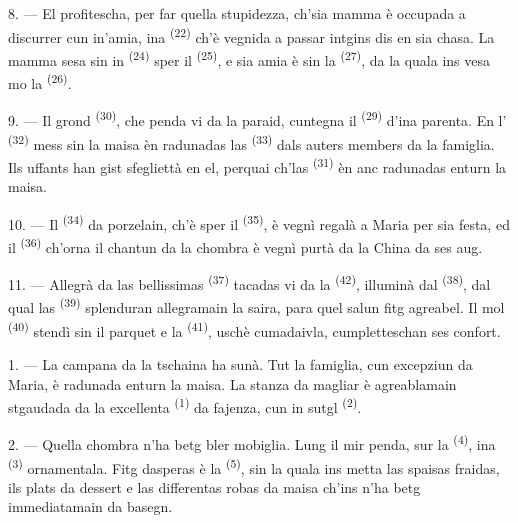 8. --- El profitescha, per far quella stupidezza, ch'sia mamma è occupada a
discurrer cun in'amia, ina  \textsuperscript{(22)} ch'è vegnida a passar
intgins dis en sia chasa. La mamma sesa sin in 
\textsuperscript{(24)} sper il  \textsuperscript{(25)}, e sia amia è sin
la  \textsuperscript{(27)}, da la quala ins vesa mo la
 \textsuperscript{(26)}.

9. --- Il grond  \textsuperscript{(30)}, che penda vi da la paraid,
cuntegna il  \textsuperscript{(29)} d'ina parenta. En l'
\textsuperscript{(32)} mess sin la maisa èn radunadas las 
\textsuperscript{(33)} dals auters members da la famiglia. Ils uffants han gist
sfegliettà en el, perquai ch'las  \textsuperscript{(31)} èn anc
radunadas enturn la maisa.

10. --- Il  \textsuperscript{(34)} da porzelain, ch'è sper il
 \textsuperscript{(35)}, è vegnì regalà a Maria per sia
festa, ed il  \textsuperscript{(36)} ch'orna il chantun da la
chombra è vegnì purtà da la China da ses aug.

11. --- Allegrà da las bellissimas  \textsuperscript{(37)} tacadas
vi da la  \textsuperscript{(42)}, illuminà dal 
\textsuperscript{(38)}, dal qual las 
\textsuperscript{(39)} splenduran allegramain la saira, para quel salun fitg
agreabel. Il mol  \textsuperscript{(40)} stendì sin il parquet e la
 \textsuperscript{(41)}, uschè cumadaivla, cumpletteschan ses
confort.

\VUsaut{3.6mm}
\VUsaut{3.0mm}

1. --- La campana da la tschaina ha sunà. Tut la famiglia, cun excepziun da Maria,
è radunada enturn la maisa. La stanza da magliar è agreablamain stgaudada da la
excellenta  \textsuperscript{(1)} da fajenza, cun in sutgl 
\textsuperscript{(2)}.

2. --- Quella chombra n'ha betg bler mobiglia. Lung il mir penda, sur la
 \textsuperscript{(4)}, ina  \textsuperscript{(3)}
ornamentala. Fitg dasperas è la  \textsuperscript{(5)}, sin la quala
ins metta las spaisas fraidas, ils plats da dessert e las differentas robas da
maisa ch'ins n'ha betg immediatamain da basegn.

